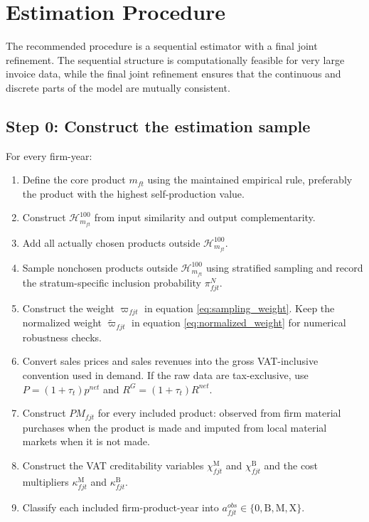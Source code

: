 \documentclass[11pt,a4paper]{article}
\newcommand{\mc}{\mathcal}
\newcommand{\M}{\mathrm{M}}
\newcommand{\B}{\mathrm{B}}
\newcommand{\X}{\mathrm{X}}
\begin{document}
\section{Estimation Procedure}
\label{sec:estimation}

The recommended procedure is a sequential estimator with a final joint refinement. The sequential structure is computationally feasible for very large invoice data, while the final joint refinement ensures that the continuous and discrete parts of the model are mutually consistent.

\subsection{Step 0: Construct the estimation sample}

For every firm-year:
\begin{enumerate}
    \item Define the core product $m_{ft}$ using the maintained empirical rule, preferably the product with the highest self-production value.
    \item Construct $\mc{H}^{100}_{m_{ft}}$ from input similarity and output complementarity.
    \item Add all actually chosen products outside $\mc{H}^{100}_{m_{ft}}$.
    \item Sample nonchosen products outside $\mc{H}^{100}_{m_{ft}}$ using stratified sampling and record the stratum-specific inclusion probability $\pi^{N}_{fjt}$.
    \item Construct the weight $\varpi_{fjt}$ in equation \eqref{eq:sampling_weight}. Keep the normalized weight $\widetilde\varpi_{fjt}$ in equation \eqref{eq:normalized_weight} for numerical robustness checks.
    \item Convert sales prices and sales revenues into the gross VAT-inclusive convention used in demand. If the raw data are tax-exclusive, use $P=(1+\tau_t)p^{net}$ and $R^G=(1+\tau_t)R^{net}$.
    \item Construct $PM_{fjt}$ for every included product: observed from firm material purchases when the product is made and imputed from local material markets when it is not made.
    \item Construct the VAT creditability variables $\chi^{\M}_{fjt}$ and $\chi^{\B}_{fjt}$ and the cost multipliers $\kappa^{\M}_{fjt}$ and $\kappa^{\B}_{fjt}$.
    \item Classify each included firm-product-year into $a^{obs}_{fjt}\in\{0,\B,\M,\X\}$.
\end{enumerate}
\end{document}
